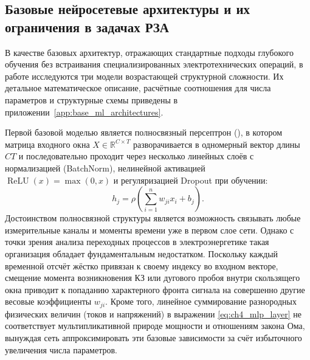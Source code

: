 \subsection{Базовые нейросетевые архитектуры и их ограничения в задачах РЗА}
\label{sec:ch4_simplemlp}
\label{sec:ch4_simplecnn}
\label{sec:ch4_resnet}

В качестве базовых архитектур, отражающих стандартные подходы глубокого
обучения без встраивания специализированных электротехнических операций,
в работе исследуются три модели возрастающей структурной сложности. Их
детальное математическое описание, расчётные соотношения для числа
параметров и структурные схемы приведены в
приложении~\ref{app:base_ml_architectures}.

Первой базовой моделью является полносвязный персептрон (),
в котором матрица входного окна $X\in\mathbb{R}^{C\times T}$
разворачивается в одномерный вектор длины $CT$ и последовательно
проходит через несколько линейных слоёв с нормализацией (BatchNorm),
нелинейной активацией $\operatorname{ReLU}(x)=\max(0,x)$ и регуляризацией
Dropout при обучении:
\begin{equation}
    h_j=\rho\left(\sum_{i=1}^{n}w_{ji}x_i+b_j\right).
    \label{eq:ch4_mlp_layer}
\end{equation}
Достоинством полносвязной структуры является возможность связывать любые
измерительные каналы и моменты времени уже в первом слое сети. Однако с
точки зрения анализа переходных процессов в электроэнергетике такая
организация обладает фундаментальным недостатком. Поскольку каждый
временной отсчёт жёстко привязан к своему индексу во входном векторе,
смещение момента возникновения КЗ или дугового пробоя внутри скользящего
окна приводит к попаданию характерного фронта сигнала на совершенно
другие весовые коэффициенты $w_{ji}$. Кроме того, линейное суммирование
разнородных физических величин (токов и напряжений) в выражении
\eqref{eq:ch4_mlp_layer} не соответствует мультипликативной природе
мощности и отношениям закона Ома, вынуждая сеть аппроксимировать эти
базовые зависимости за счёт избыточного увеличения числа параметров.

